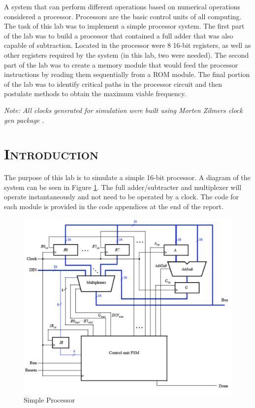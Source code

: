 \documentclass[11pt]{report}
\begin{document}
\begin{spacing}{1.5}
A system that can perform different operations based on numerical operations considered a processor.  Processors are the basic control units of all computing.  The task of this lab was to implement a simple processor system.  The first part of the lab was to build a processor that contained a full adder that was also capable of subtraction.  Located in the processor were 8 16-bit registers, as well as other registers required by the system (in this lab, two were needed).  The second part of the lab was to create a memory module that would feed the processor instructions by reading them sequentially from a ROM module.  The final portion of the lab was to identify critical paths in the processor circuit and then postulate methods to obtain the maximum viable frequency.

\vspace{4.5in}

\textit{Note: All clocks generated for simulation were built using Morten Zilmers clock gen package \cite{Synth}.}

\thispagestyle{empty} %
\clearpage
\setcounter{page}{1}

\section*{\scshape Introduction} %
\label{cha:introduction}

The purpose of this lab is to simulate a simple 16-bit processor.  A diagram of the system can be seen in Figure \ref{fig:system}.  The full adder/subtracter and multiplexer will operate instantaneously and not need to be operated by a clock.  The code for each module is provided in the code appendices at the end of the report.

\vspace{15px}
\begin{figure}[H]
    \centering
    \includegraphics[width=1.0\textwidth,keepaspectratio]{system.png}
    \caption{Simple Processor}
    \label{fig:system}
\end{figure}


\end{spacing}
\end{document}
